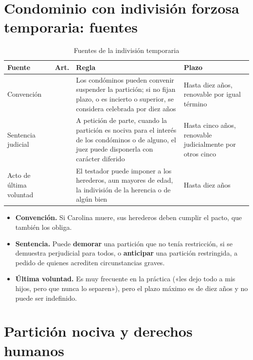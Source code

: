 \documentclass[12pt,oneside]{book}
\begin{document}
\section{Condominio con indivisión forzosa temporaria: fuentes}

\begin{table}[H]
\centering
\small
\begin{tabularx}{\textwidth}{>{\raggedright\arraybackslash}p{}>{\raggedright\arraybackslash}p{}>{\raggedright\arraybackslash}X>{\raggedright\arraybackslash}p{}}
\toprule
\textbf{Fuente} & \textbf{Art.} & \textbf{Regla} & \textbf{Plazo} \\
\midrule
Convención & 2000 & Los condóminos pueden convenir suspender la partición; si no fijan plazo, o es incierto o superior, se considera celebrada por diez años & Hasta diez años, renovable por igual término \\
Sentencia judicial & 2001 & A petición de parte, cuando la partición es nociva para el interés de los condóminos o de alguno, el juez puede disponerla con carácter diferido & Hasta cinco años, renovable judicialmente por otros cinco \\
Acto de última voluntad & 2330 & El testador puede imponer a los herederos, aun mayores de edad, la indivisión de la herencia o de algún bien & Hasta diez años \\
\bottomrule
\end{tabularx}
\caption{Fuentes de la indivisión temporaria}
\end{table}

\begin{itemize}
    \item \textbf{Convención.} Si Carolina muere, sus herederos deben cumplir el pacto, que también los obliga.
    \item \textbf{Sentencia.} Puede \textbf{demorar} una partición que no tenía restricción, si se demuestra perjudicial para todos, o \textbf{anticipar} una partición restringida, a pedido de quienes acrediten circunstancias graves.
    \item \textbf{Última voluntad.} Es muy frecuente en la práctica («les dejo todo a mis hijos, pero que nunca lo separen»), pero el plazo máximo es de diez años y no puede ser indefinido.
\end{itemize}

\section{Partición nociva y derechos humanos}
\end{document}
